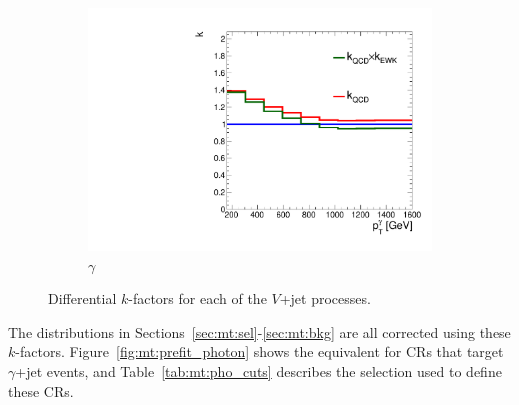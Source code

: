 \begin{figure}[]
\begin{center}
\begin{subfigure}[t]{0.32\textwidth}
            \includegraphics[width=\textwidth]{figures/monotop/kfactors/acorr_ptv.pdf}
            \caption{$\gamma$}
        \end{subfigure}
        \caption{Differential $k$-factors for each of the $V$+jet processes.}
        \label{fig:mt:vlonlo}
    \end{center}
\end{figure}

The distributions in Sections~\ref{sec:mt:sel}-\ref{sec:mt:bkg} are all corrected using these $k$-factors.
Figure~\ref{fig:mt:prefit_photon} shows the equivalent for CRs that target $\gamma$+jet events, and Table~\ref{tab:mt:pho_cuts} describes the selection used to define these CRs.

